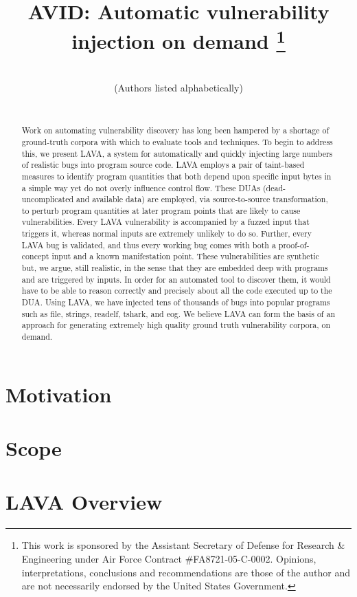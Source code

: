 \documentclass[conference]{IEEEtran}
\title{AVID: Automatic vulnerability injection on demand
  \thanks{This work is sponsored by the Assistant Secretary of Defense
    for Research \& Engineering under Air Force Contract
    \#FA8721-05-C-0002.  Opinions, interpretations, conclusions and
    recommendations are those of the author and are not necessarily
    endorsed by the United States Government.} }
\author{
\IEEEauthorblockN{Brendan Dolan-Gavitt\IEEEauthorrefmark{1}, Patrick Hulin\IEEEauthorrefmark{2}, Tim Leek\IEEEauthorrefmark{2}, Ryan Whelan\IEEEauthorrefmark{2}}
\\
\small (Authors listed alphabetically) \\
\\
\IEEEauthorblockA{\IEEEauthorrefmark{1}NYU\\brendandg@nyu.edu}
\IEEEauthorblockA{\IEEEauthorrefmark{2}MIT Lincoln Laboratory\\
\{patrick.hulin,tleek,rwhelan\}@ll.mit.edu}
}
\begin{document}
\maketitle

\begin{abstract}

Work on automating vulnerability discovery has long been hampered by a shortage of ground-truth corpora with which to evaluate tools and techniques.
To begin to address this, we present LAVA, a system for automatically and quickly injecting large numbers of realistic bugs into program source code.  
LAVA employs a pair of taint-based measures to identify program quantities that both depend upon specific input bytes in a simple way yet do not overly influence control flow.
These DUAs (dead-uncomplicated and available data) are employed, via source-to-source transformation, to perturb program quantities at later program points that are likely to cause vulnerabilities.
Every LAVA vulnerability is accompanied by a fuzzed input that triggers it, whereas normal inputs are extremely unlikely to do so.
Further, every LAVA bug is validated, and thus every working bug comes with both a proof-of-concept input and a known manifestation point.  
These vulnerabilities are synthetic but, we argue, still realistic, in the sense that they are embedded deep with programs and are triggered by inputs.
In order for an automated tool to discover them, it would have to be able to reason correctly and precisely about all the code executed up to the DUA.
Using LAVA, we have injected tens of thousands of bugs into popular programs such as file, strings, readelf, tshark, and eog.
We believe LAVA can form the basis of an approach for generating extremely high quality ground truth vulnerability corpora, on demand.



\end{abstract}

\section{Motivation}
\label{sec:motivation}


\section{Scope}
\label{sec:scope}


\section{LAVA Overview}
\label{sec:overview}

\end{document}
